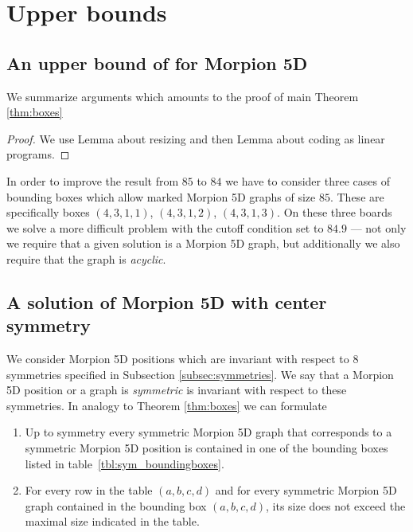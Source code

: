 \section{Upper bounds}
\label{sec:upper}

  
\subsection{An upper bound of \therecord for Morpion 5D}
\label{subsec:84}

We summarize arguments which amounts to the proof of main Theorem \ref{thm:boxes}
\begin{proof}
We use Lemma about resizing and then Lemma about coding as linear programs. 
\end{proof}

In order to improve the result from $85$ to $84$ we have to consider three cases of bounding boxes which allow marked Morpion 5D graphs of size $85$. These
are specifically boxes $(4,3,1,1)$, $(4,3,1,2)$, $(4,3,1,3)$.
On these three boards we solve a more difficult problem with the cutoff condition set to $84.9$ --- not only we require that a given solution is a 
Morpion 5D graph, but additionally we also require that the graph is {\em acyclic}. 

\subsection{A solution of Morpion 5D with center symmetry}
We consider Morpion 5D positions which are invariant with respect to $8$ symmetries 
specified in Subsection \ref{subsec:symmetries}. We say that a Morpion 5D position or a graph is {\em symmetric} is invariant with respect to these symmetries.  
In analogy to Theorem \ref{thm:boxes} we can formulate 
\begin{theorem}
\begin{enumerate}
\item Up to symmetry every symmetric Morpion 5D graph that corresponds to a symmetric Morpion 5D position
    is contained in one of the bounding boxes listed in table~\ref{tbl:sym_boundingboxes}.
\item For every row in the table $(a,b,c,d)$ and for every symmetric Morpion 5D graph contained in the bounding box  $(a,b,c,d)$,
its size does not exceed the maximal size indicated in the table.
\end{enumerate} 
\label{thm:sym_boxes}
\end{theorem}

